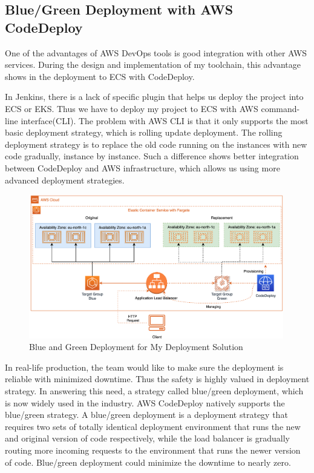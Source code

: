 \subsection{Blue/Green Deployment with AWS CodeDeploy}
One of the advantages of AWS DevOps tools is good integration with other AWS services. During the design and implementation of my toolchain, this advantage shows in the deployment to ECS with CodeDeploy.
\par
In Jenkins, there is a lack of specific plugin that helps us deploy the project into ECS or EKS. Thus we have to deploy my project to ECS with AWS command-line interface(CLI). The problem with AWS CLI is that it only supports the most basic deployment strategy, which is rolling update deployment. The rolling deployment strategy is to replace the old code running on the instances with new code gradually, instance by instance.
Such a difference shows better integration between CodeDeploy and AWS infrastructure, which allows us using more advanced deployment strategies. 
\begin{figure}[h]
 \centering
 \includegraphics[width=0.99\textwidth]{pics/bg.png}
 \caption{Blue and Green Deployment for My Deployment Solution}
 \label{fig:bg}
\end{figure}
\par
In real-life production, the team would like to make sure the deployment is reliable with minimized downtime. Thus the safety is highly valued in deployment strategy. In answering this need, a strategy called blue/green deployment, which is now widely used in the industry. AWS CodeDeploy natively supports the blue/green strategy.
A blue/green deployment is a deployment strategy that requires two sets of totally identical deployment environment that runs the new and original version of code respectively, while the load balancer is gradually routing more incoming requests to the environment that runs the newer version of code. Blue/green deployment could minimize the downtime to nearly zero\cite{10.1007/978-3-030-45989-5_6}.

